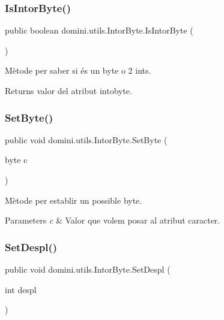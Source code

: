 \subsubsection{\texorpdfstring{Is\+Intor\+Byte()}{IsIntorByte()}}
{\footnotesize\ttfamily public boolean domini.\+utils.\+Intor\+Byte.\+Is\+Intor\+Byte (\begin{DoxyParamCaption}{ }\end{DoxyParamCaption})\hspace{0.3cm}{\ttfamily [inline]}}



Mètode per saber si és un byte o 2 int\textquotesingle{}s. 

\begin{DoxyReturn}{Returns}
valor del atribut intobyte. 
\end{DoxyReturn}
\mbox{\label{classdomini_1_1utils_1_1IntorByte_a02677743722d43ce96904e03eb82f25b}} 
\subsubsection{\texorpdfstring{Set\+Byte()}{SetByte()}}
{\footnotesize\ttfamily public void domini.\+utils.\+Intor\+Byte.\+Set\+Byte (\begin{DoxyParamCaption}\item[{byte}]{c }\end{DoxyParamCaption})\hspace{0.3cm}{\ttfamily [inline]}}



Mètode per establir un possible byte. 


\begin{DoxyParams}{Parameters}
{\em c} & Valor que volem posar al atribut caracter. \\
\hline
\end{DoxyParams}
\mbox{\label{classdomini_1_1utils_1_1IntorByte_a01c26f8a3a94b2bc31fda2f5989fca00}} 
\subsubsection{\texorpdfstring{Set\+Despl()}{SetDespl()}}
{\footnotesize\ttfamily public void domini.\+utils.\+Intor\+Byte.\+Set\+Despl (\begin{DoxyParamCaption}\item[{int}]{despl }\end{DoxyParamCaption})\hspace{0.3cm}{\ttfamily [inline]}}



